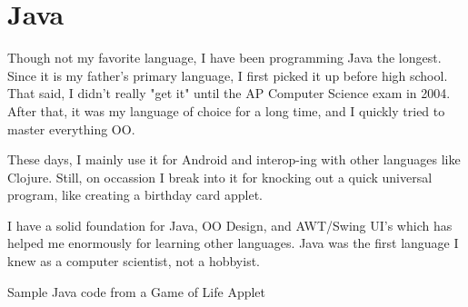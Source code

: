 \section{Java}

Though not my favorite language, I have been programming Java the longest.
Since it is my father's primary language, I first picked it up before high
school. That said, I didn't really "get it" until the AP Computer Science exam
in 2004.  After that, it was my language of choice for a long time, and I
quickly tried to master everything OO.

These days, I mainly use it for Android and interop-ing with other languages
like Clojure.  Still, on occassion I break into it for knocking out a quick
universal program, like creating a birthday card applet.

I have a solid foundation for Java, OO Design, and AWT/Swing UI's which has
helped me enormously for learning other languages.  Java was the first language
I knew as a computer scientist, not a hobbyist.

{Sample Java code from a Game of Life Applet}

